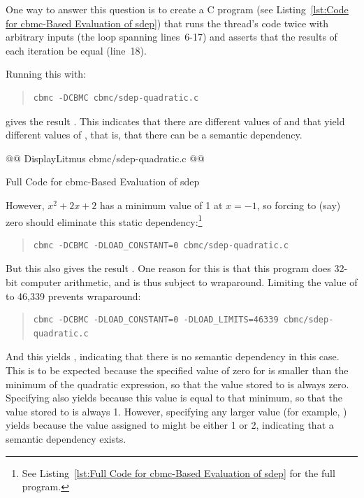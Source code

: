 \documentclass[10]{article}
\begin{document}
One way to answer this question is to create a C program
(see Listing~\ref{lst:Code for cbmc-Based Evaluation of sdep})
that runs the  thread's code twice with arbitrary inputs
(the loop spanning lines~6-17) and asserts that the results of
each iteration be equal (line~18).

Running this with:

\begin{quote}
\scriptsize
\begin{verbatim}
cbmc -DCBMC cbmc/sdep-quadratic.c
\end{verbatim}
\end{quote}

gives the result .
This indicates that there are different values of  and 
that yield different values of , that is, that there can be
a semantic dependency.

\begin{listing}[tbp]
@@ DisplayLitmus cbmc/sdep-quadratic.c @@
\caption{Full Code for cbmc-Based Evaluation of sdep}
\label{lst:Full Code for cbmc-Based Evaluation of sdep}
\end{listing}

However, $x^2 + 2x + 2$ has a minimum value of 1 at $x=-1$, so
forcing  to (say) zero should eliminate this static
dependency:\footnote{
	See Listing~\ref{lst:Full Code for cbmc-Based Evaluation of sdep}
	for the full  program.}

\begin{quote}
\scriptsize
\begin{verbatim}
cbmc -DCBMC -DLOAD_CONSTANT=0 cbmc/sdep-quadratic.c
\end{verbatim}
\end{quote}

But this also gives the result .
One reason for this is that this program does 32-bit computer arithmetic,
and is thus subject to wraparound.
Limiting the value of  to 46,339 prevents wraparound:

\begin{quote}
\scriptsize
\begin{verbatim}
cbmc -DCBMC -DLOAD_CONSTANT=0 -DLOAD_LIMITS=46339 cbmc/sdep-quadratic.c
\end{verbatim}
\end{quote}

And this yields , indicating that there
is no semantic dependency in this case.
This is to be expected because the specified value of zero for 
is smaller than the minimum of the quadratic expression, so that the
value stored to  is always zero.
Specifying  also yields 
because this value is equal to that minimum, so that the value stored to
 is always 1.
However, specifying any larger value (for example, )
yields  because the value assigned to 
might be either 1 or 2, indicating that a semantic dependency exists.
\end{document}
